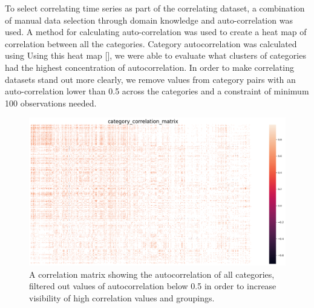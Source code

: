 To select correlating time series as part of the correlating dataset, a combination of manual data selection through domain knowledge and auto-correlation was used.
A method for calculating auto-correlation was used to create a heat map of correlation between all the categories.
Category autocorrelation was calculated using
Using this heat map [], we were able to evaluate what clusters of categories had the highest concentration of autocorrelation.
In order to make correlating datasets stand out more clearly, we remove values from category pairs with an auto-correlation lower than 0.5 across the categories
and a constraint of minimum 100 observations needed.
\begin{figure}[H]
  \centering
  \includegraphics[width=\textwidth]{./figs/dataset/category_correlation_matrix.png}
  \hfill
  \caption{A correlation matrix showing the autocorrelation of all categories, filtered out values of autocorrelation below 0.5 in order to increase visibility of high correlation values and groupings.}
  \label{fig:dataset:heatmap_correlating}
\end{figure}

